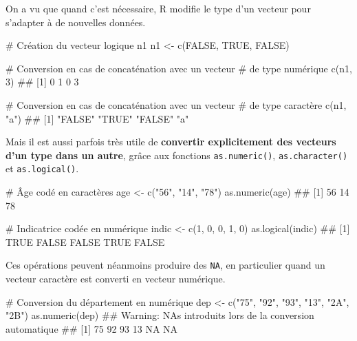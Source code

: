 \documentclass[12pt,twosided, notitlepage]{book}
\newenvironment{Shaded}{}{}
\newcommand{\KeywordTok}[1]{\textcolor[rgb]{0.00,0.00,1.00}{{#1}}}
\newcommand{\DecValTok}[1]{{#1}}
\newcommand{\StringTok}[1]{\textcolor[rgb]{0.00,0.50,0.50}{{#1}}}
\newcommand{\CommentTok}[1]{\textcolor[rgb]{0.00,0.50,0.00}{{#1}}}
\newcommand{\OtherTok}[1]{\textcolor[rgb]{1.00,0.25,0.00}{{#1}}}
\newcommand{\NormalTok}[1]{{#1}}
\renewenvironment{Shaded}{\begin{snugshade}}{\end{snugshade}}
\begin{document}
On a vu que quand c'est nécessaire, R modifie le type d'un vecteur pour
s'adapter à de nouvelles données.

\begin{Shaded}
\begin{Highlighting}[]
\CommentTok{# Création du vecteur logique n1}
\NormalTok{n1 <-}\StringTok{ }\KeywordTok{c}\NormalTok{(}\OtherTok{FALSE}\NormalTok{, }\OtherTok{TRUE}\NormalTok{, }\OtherTok{FALSE}\NormalTok{)}

\CommentTok{# Conversion en cas de concaténation avec un vecteur }
\CommentTok{# de type numérique}
\KeywordTok{c}\NormalTok{(n1, }\DecValTok{3}\NormalTok{)}
  \NormalTok{## [1] 0 1 0 3}

\CommentTok{# Conversion en cas de concaténation avec un vecteur }
\CommentTok{# de type caractère}
\KeywordTok{c}\NormalTok{(n1, }\StringTok{"a"}\NormalTok{)}
  \NormalTok{## [1] "FALSE" "TRUE"  "FALSE" "a"}
\end{Highlighting}
\end{Shaded}

Mais il est aussi parfois très utile de \textbf{convertir explicitement
des vecteurs d'un type dans un autre}, grâce aux fonctions
\texttt{as.numeric()},
\texttt{as.character()} et
\texttt{as.logical()}.

\begin{Shaded}
\begin{Highlighting}[]
\CommentTok{# Âge codé en caractères}
\NormalTok{age <-}\StringTok{ }\KeywordTok{c}\NormalTok{(}\StringTok{"56"}\NormalTok{, }\StringTok{"14"}\NormalTok{, }\StringTok{"78"}\NormalTok{)}
\KeywordTok{as.numeric}\NormalTok{(age)}
  \NormalTok{## [1] 56 14 78}

\CommentTok{# Indicatrice codée en numérique}
\NormalTok{indic <-}\StringTok{ }\KeywordTok{c}\NormalTok{(}\DecValTok{1}\NormalTok{, }\DecValTok{0}\NormalTok{, }\DecValTok{0}\NormalTok{, }\DecValTok{1}\NormalTok{, }\DecValTok{0}\NormalTok{)}
\KeywordTok{as.logical}\NormalTok{(indic)}
  \NormalTok{## [1]  TRUE FALSE FALSE  TRUE FALSE}
\end{Highlighting}
\end{Shaded}

Ces opérations peuvent néanmoins produire des \texttt{NA}, en
particulier quand un vecteur caractère est converti en vecteur
numérique.

\begin{Shaded}
\begin{Highlighting}[]
\CommentTok{# Conversion du département en numérique}
\NormalTok{dep <-}\StringTok{ }\KeywordTok{c}\NormalTok{(}\StringTok{"75"}\NormalTok{, }\StringTok{"92"}\NormalTok{, }\StringTok{"93"}\NormalTok{, }\StringTok{"13"}\NormalTok{, }\StringTok{"2A"}\NormalTok{, }\StringTok{"2B"}\NormalTok{)}
\KeywordTok{as.numeric}\NormalTok{(dep)}
  \NormalTok{## Warning: NAs introduits lors de la conversion automatique}
  \NormalTok{## [1] 75 92 93 13 NA NA}
\end{Highlighting}
\end{Shaded}
\end{document}
